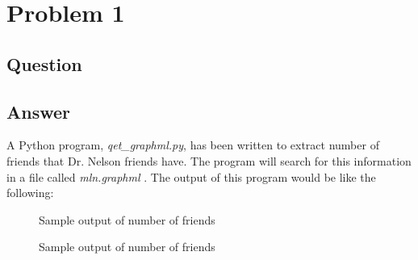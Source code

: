 \section{Problem 1}

\subsection{Question}
\vspace*{10pt}


\subsection{Answer}
\vspace{2mm}
A Python program, {\it qet\_graphml.py}, has been written to extract\cite{xml} number of friends that Dr. Nelson friends have. The program will search for this information in a file called {\it mln.graphml} \cite{graphML}. The output of this program would be like the following:
\vspace{5mm}

\begin{figure}[h!]
\centering
{}
\caption{Sample output of number of friends}
\label{fig:number_friends_1}
\end{figure}
\vspace*{5pt}

\begin{figure}[h!]
\centering
{}
\caption{Sample output of number of friends}
\label{fig:number_friends_2}
\end{figure}
\clearpage
\newpage
\vspace*{5pt}


